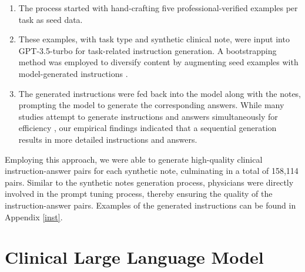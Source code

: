 \documentclass[11pt]{article}
\begin{document}
\begin{enumerate} [leftmargin=4.5mm]
    \item The process started with hand-crafting five professional-verified examples per task as seed data.
    \item These examples, with task type and synthetic clinical note, were input into GPT-3.5-turbo for task-related instruction generation. A bootstrapping method was employed to diversify content by augmenting seed examples with model-generated instructions \citep{wang2022self}.
  \item The generated instructions were fed back into the model along with the notes, prompting the model to generate the corresponding answers. While many studies attempt to generate instructions and answers simultaneously for efficiency \citep{wang2022self, alpaca}, our empirical findings indicated that a sequential generation results in more detailed instructions and answers.
\end{enumerate}

Employing this approach, we were able to generate high-quality clinical instruction-answer pairs for each synthetic note, culminating in a total of 158,114 pairs. 
Similar to the synthetic notes generation process, physicians were directly involved in the prompt tuning process, thereby ensuring the quality of the instruction-answer pairs. 
Examples of the generated instructions can be found in Appendix \ref{inst}.








\section{Clinical Large Language Model} \label{4}
\end{document}

